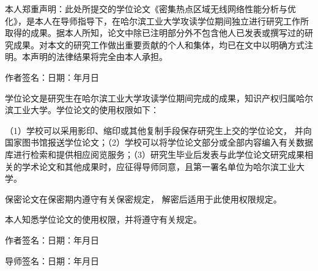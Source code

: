 
\vspace{\baselineskip}
\begin{center}\hei{}\end{center}
\vspace{1em}

本人郑重声明：此处所提交的学位论文《密集热点区域无线网络性能分析与优化》，是本人在导师指导下，在哈尔滨工业大学攻读学位期间独立进行研究工作所取得的成果。据本人所知，论文中除已注明部分外不包含他人已发表或撰写过的研究成果。对本文的研究工作做出重要贡献的个人和集体，均已在文中以明确方式注明。本声明的法律结果将完全由本人承担。

\vspace{\baselineskip}
\hspace{6em}作者签名：\hfill 日期：\hspace{2.5em}年\hspace{1.5em}月\hspace{1.5em}日

\vspace{2\baselineskip}
\begin{center}\hei{}\end{center}
\vspace{1em}

学位论文是研究生在哈尔滨工业大学攻读学位期间完成的成果，知识产权归属哈尔滨工业大学。学位论文的使用权限如下：

（1）学校可以采用影印、缩印或其他复制手段保存研究生上交的学位论文， 并向国家图书馆报送学位论文；（2）学校可以将学位论文部分或全部内容编入有关数据库进行检索和提供相应阅览服务；（3）研究生毕业后发表与此学位论文研究成果相关的学术论文和其他成果时，应征得导师同意，且第一署名单位为哈尔滨工业大学。

保密论文在保密期内遵守有关保密规定， 解密后适用于此使用权限规定。

本人知悉学位论文的使用权限，并将遵守有关规定。

\vspace{1\baselineskip}
\hspace{6em}作者签名：\hfill 日期：\hspace{2.5em}年\hspace{1.5em}月\hspace{1.5em}日

\vspace{1\baselineskip}
\hspace{6em}导师签名：\hfill 日期：\hspace{2.5em}年\hspace{1.5em}月\hspace{1.5em}日
